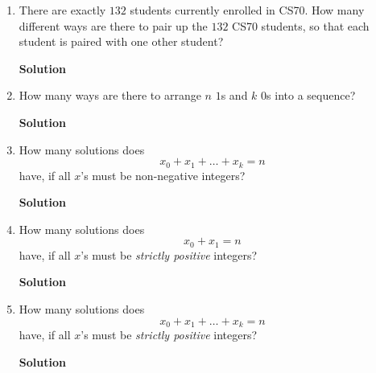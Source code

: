\documentclass{article}\usepackage{amsmath,amssymb,amsthm,tikz,tkz-graph,color,chngpage,soul,hyperref,csquotes,graphicx,floatrow}\newcommand*{\QEDB}{\hfill\ensuremath{\square}}\newtheorem*{prop}{Proposition}\renewcommand{\theenumi}{\alph{enumi}}\usepackage[shortlabels]{enumitem}\usepackage[nobreak=true]{mdframed}\usetikzlibrary{matrix,calc}\MakeOuterQuote{"}\usepackage[margin=0.75in]{geometry} \newtheorem{theorem}{Theorem}
\begin{document}
\begin{enumerate}
\begin{mdframed}
\end{mdframed}
\item There are exactly $132$ students currently enrolled in CS70. How many different ways are there to pair up the $132$ CS70 students, so that each student is paired with one other student?
\begin{mdframed}
\textbf{Solution}

\end{mdframed}
\item How many ways are there to arrange $n$ $1$s and $k$ $0$s into a sequence?
\begin{mdframed}
\textbf{Solution}

\end{mdframed}
\item How many solutions does $$x_0+x_1+\ldots+x_k=n$$ have, if all $x$'s must be non-negative integers?
\begin{mdframed}
\textbf{Solution}

\end{mdframed}
\item How many solutions does $$x_0+x_1=n$$ have, if all $x$'s must be \textit{strictly positive} integers?
\begin{mdframed}
\textbf{Solution}

\end{mdframed}
\item How many solutions does $$x_0+x_1+\ldots+x_k=n$$ have, if all $x$'s must be \textit{strictly positive} integers?
 \begin{mdframed}
\textbf{Solution}

\end{mdframed}
\end{enumerate}
\clearpage

\end{document}
